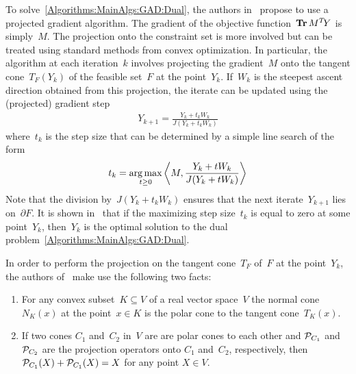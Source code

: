 To solve~\eqref{Algorithms:MainAlgs:GAD:Dual}, the authors in~\cite{Lin:2009kx} propose to use a projected gradient algorithm. The gradient of the objective function~$\operatorname{\mathbf{Tr}} M^T\!Y$ is simply~$M$. The projection onto the constraint set is more involved but can be treated using standard methods from convex optimization. In particular, the algorithm at each iteration~$k$ involves projecting the gradient~$M$ onto the tangent cone~$T_F(Y_k)$ of the feasible set~$F$ at the point~$Y_k$. If~$W_k$ is the steepest ascent direction obtained from this projection, the iterate can be updated using the (projected) gradient step
%
\begin{align}
Y_{k+1} = \frac{Y_k+t_kW_k}{J(Y_k+t_kW_k)}
\label{Algorithms:MainAlgs:GAD:GradStep}
\end{align}
%
where~$t_k$ is the step size that can be determined by a simple line search of the form
%
\begin{align}
t_k = \operatorname*{arg\,max}_{t\geq0} \left\langle M, \frac{Y_k+t W_k}{J(Y_k + t W_k)} \right\rangle
\label{Algorithms:MainAlgs:GAD:LineSearch}
\end{align}
%
Note that the division by~$J(Y_k+t_kW_k)$ ensures that the next iterate~$Y_{k+1}$ lies on~$\partial F$. It is shown in~\cite{Lin:2009kx} that if the maximizing step size~$t_k$ is equal to zero at some point~$Y_k$, then~$Y_k$ is the optimal solution to the dual problem~\eqref{Algorithms:MainAlgs:GAD:Dual}.


In order to perform the projection on the tangent cone~$T_F$ of~$F$ at the point~$Y_k$, the authors of~\cite{Lin:2009kx} make use the following two facts:
\begin{enumerate}
\item For any convex subset~$K \subseteq V$ of a real vector space~$V$ the normal cone~$N_K(x)$ at the point~$x\in K$ is the polar cone to the tangent cone~$T_K(x)$.
\item If two cones $C_1$ and~$C_2$ in~$V$ are are polar cones to each other and ${\mathcal{P}}_{C_1}$ and ${\mathcal{P}}_{C_2}$ are the projection operators onto $C_1$ and~$C_2$, respectively, then ${\mathcal{P}}_{C_1}(X)+ {\mathcal{P}}_{C_1}(X) = X $ for any point $X\in V$. 
\end{enumerate}

